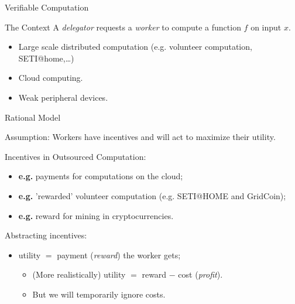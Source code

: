 
\begin{frame}{Verifiable Computation}
	
		\begin{block}{The Context}
			A \textit{delegator} requests a \textit{worker} to compute a function $f$ on input $x$.
		\end{block}
		\onslide<+->
		\begin{itemize}[<+- | alert@+>]
			\item Large scale distributed computation (e.g. volunteer computation, SETI@home,\dots)
			\item Cloud computing.
			\item Weak peripheral devices.
		\end{itemize}
		
		\onslide<+->

\end{frame}
%
\begin{frame}{Rational Model}
	\begin{block}{Assumption: }
		Workers have incentives and will act to maximize their utility.
	\end{block}
	\pause
\begin{block}{Incentives in Outsourced Computation:}
	\begin{itemize}[<+- | alert@+>]
		\item \textbf{e.g.} payments for computations on the cloud; %
		\item \textbf{e.g.} 'rewarded' volunteer computation (e.g. SETI@HOME and GridCoin);
		\item \textbf{e.g.} reward for mining in cryptocurrencies.
	\end{itemize}
\end{block}
\onslide<+->
\begin{block}{Abstracting incentives:}
\begin{itemize}[<+- | alert@+>]
	\item utility $ = $  payment (\textit{reward}) the worker gets;
	\small{
		\begin{itemize}
			\item (More realistically) utility $ = $ reward $ - $ cost (\textit{profit}).
			\item But we will temporarily ignore costs.
		\end{itemize}}
	\end{itemize}
\end{block}
\end{frame}


